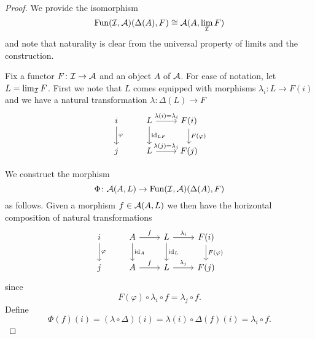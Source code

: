 \documentclass[reqno, 12pt]{amsart}
\begin{document}
\begin{proof}
  We provide the isomorphism
  $$\operatorname{Fun}(\mathcal{I},\mathcal{A})(\Delta(A), F) \cong \mathcal{A}(A, \lim_{\mathcal{I}} F)$$
  and note that naturality is clear from the universal property of limits and the construction.

  Fix a functor $F \colon \mathcal{I} \to \mathcal{A}$ and an object $A$ of $\mathcal{A}$.
  For ease of notation, let $L = \lim_{\mathcal{I}} F$.
  First we note that $L$ comes equipped with morphisms $\lambda_i \colon L \to F(i)$ and  we have a natural transformation $\lambda \colon \Delta(L) \to F$
  $$\begin{tikzcd}
    i \arrow{d}{\varphi} & L \arrow{r}{\lambda(i) = \lambda_i} \arrow{d}{\id_{L F}} & F(i)\arrow{d}{F(\varphi)}\\
    j & L \arrow{r}{\lambda(j) = \lambda_j} & F(j)
  \end{tikzcd}$$

  We construct the morphism
  $$\Phi \colon \mathcal{A}(A, L) \to \operatorname{Fun}(\mathcal{I}, \mathcal{A})(\Delta(A), F)$$
  as follows.
  Given a morphism $f \in \mathcal{A}(A, L)$ we then have the horizontal composition of natural transformations
  $$\begin{tikzcd}
    i \arrow{d}{\varphi} & A \arrow{r}{f}\arrow{d}{\id_A} & L \arrow{r}{\lambda_i}\arrow{d}{\id_{L}} & F(i)\arrow{d}{F(\varphi)}\\
    j & A \arrow{r}{f} & L \arrow{r}{\lambda_j} & F(j)
  \end{tikzcd}$$
  since
  $$F(\varphi) \circ \lambda_i \circ f = \lambda_j \circ f.$$
  Define
  $$\Phi(f)(i) = (\lambda \circ \Delta)(i) = \lambda(i) \circ \Delta(f)(i) = \lambda_i \circ f.$$


\end{proof}
\end{document}
